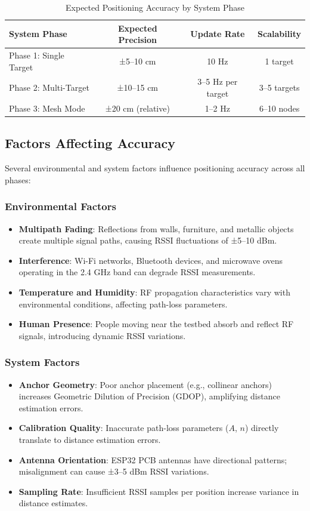 \begin{table}[H]
\centering
\caption{Expected Positioning Accuracy by System Phase}
\label{tab:expected_results}
\begin{tabular}{|l|c|c|c|}
\hline
\textbf{System Phase} & \textbf{Expected Precision} & \textbf{Update Rate} & \textbf{Scalability} \\
\hline
Phase 1: Single Target & ±5--10 cm & 10 Hz & 1 target \\
Phase 2: Multi-Target & ±10--15 cm & 3--5 Hz per target & 3--5 targets \\
Phase 3: Mesh Mode & ±20 cm (relative) & 1--2 Hz & 6--10 nodes \\
\hline
\end{tabular}
\end{table}

\subsection{Factors Affecting Accuracy}

Several environmental and system factors influence positioning accuracy across all phases:

\subsubsection{Environmental Factors}
\begin{itemize}
    \item \textbf{Multipath Fading}: Reflections from walls, furniture, and metallic objects create multiple signal paths, causing RSSI fluctuations of ±5--10 dBm.
    \item \textbf{Interference}: Wi-Fi networks, Bluetooth devices, and microwave ovens operating in the 2.4 GHz band can degrade RSSI measurements.
    \item \textbf{Temperature and Humidity}: RF propagation characteristics vary with environmental conditions, affecting path-loss parameters.
    \item \textbf{Human Presence}: People moving near the testbed absorb and reflect RF signals, introducing dynamic RSSI variations.
\end{itemize}

\subsubsection{System Factors}
\begin{itemize}
    \item \textbf{Anchor Geometry}: Poor anchor placement (e.g., collinear anchors) increases Geometric Dilution of Precision (GDOP), amplifying distance estimation errors.
    \item \textbf{Calibration Quality}: Inaccurate path-loss parameters ($A$, $n$) directly translate to distance estimation errors.
    \item \textbf{Antenna Orientation}: ESP32 PCB antennas have directional patterns; misalignment can cause ±3--5 dBm RSSI variations.
    \item \textbf{Sampling Rate}: Insufficient RSSI samples per position increase variance in distance estimates.
\end{itemize}

